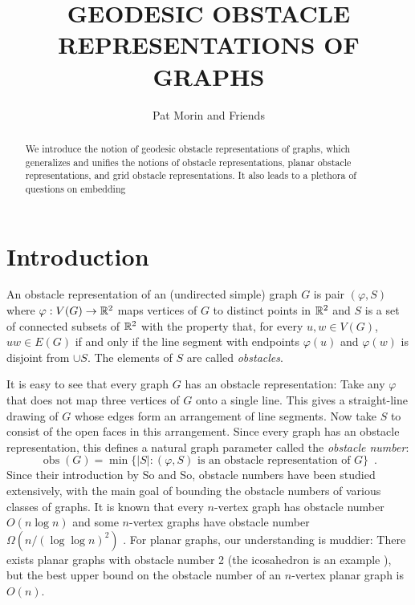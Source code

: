\documentclass{patmorin}
\title{\MakeUppercase{Geodesic Obstacle Representations of Graphs}}
\author{Pat Morin and Friends}%
\DeclareMathOperator{\ob}{obs}
\begin{document}
\begin{titlepage}
\maketitle

\begin{abstract}
  We introduce the notion of geodesic obstacle representations of graphs,
  which generalizes and unifies the notions of obstacle representations,
  planar obstacle representations, and grid obstacle representations.
  It also leads to a plethora of questions on embedding 
\end{abstract}
\end{titlepage}

\tableofcontents

\newpage


\section{Introduction}

An obstacle representation of an (undirected simple) graph $G$ is
pair $(\varphi, S)$ where $\varphi:V(G)\to\mathbb{R}^2$ maps vertices of $G$ to
distinct points in $\mathbb{R}^2$ and $S$ is a set of connected subsets of $\mathbb{R}^2$
with the property that, for every $u,w\in V(G)$, $uw\in E(G)$ if and
only if the line segment with endpoints $\varphi(u)$ and $\varphi(w)$ is
disjoint from $\cup S$.  The elements of $S$ are called \emph{obstacles}.


It is easy to see that every graph $G$ has an obstacle representation:
Take any $\varphi$ that does not map three vertices of $G$ onto a single
line. This gives a straight-line drawing of $G$ whose edges form an
arrangement of line segments.  Now take $S$ to consist of the open faces
in this arrangement.  Since every graph has an obstacle representation,
this defines a natural graph parameter called the \emph{obstacle number}:
\[
     \ob(G) = \min\{|S| :\text{$(\varphi, S)$ is an obstacle representation of $G$}\} \enspace .
\]
Since their introduction by So and So, obstacle numbers have been studied
extensively, with the main goal of bounding the obstacle numbers of
various classes of graphs.  It is known that every $n$-vertex graph has
obstacle number $O(n\log n)$ \cite{X} and some $n$-vertex graphs have
obstacle number $\Omega(n/(\log\log n)^2)$ \cite{Y}.  For planar graphs,
our understanding is muddier: There exists planar graphs with obstacle
number 2 (the icosahedron is an example \cite{X}), but the best upper
bound on the obstacle number of an $n$-vertex planar graph is $O(n)$.
\end{document}
